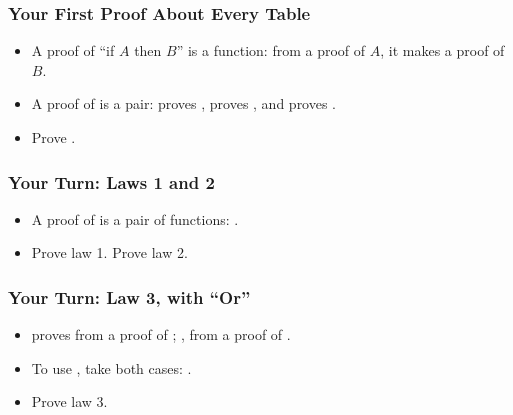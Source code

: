 \documentclass{ltx-talk}
\begin{document}
\begin{frame*}
  \frametitle{Your First Proof About Every Table}
  \begin{itemize}
    \item A proof of ``if $A$ then $B$'' is a function: from a proof
       of $A$, it makes a proof of $B$.
    \item A proof  of  is a pair:  proves
      ,  proves , and  proves
      .
    \item {} Prove .
  \end{itemize}
\end{frame*}

\begin{frame*}
  \frametitle{Your Turn: Laws 1 and 2}
  \begin{itemize}
    \item A proof of  is a pair of functions: .
    \item {} Prove law 1.  Prove law 2.
  \end{itemize}
\end{frame*}

\begin{frame*}
  \frametitle{Your Turn: Law 3, with ``Or''}
  \begin{itemize}
    \item {} proves  from a proof  of
      ; , from a proof  of .
    \item To use , take both cases:
      .
    \item {} Prove law 3.
  \end{itemize}
\end{frame*}
\end{document}
